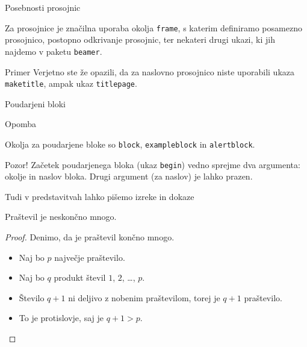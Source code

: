 \begin{frame}{Posebnosti prosojnic}


	Za prosojnice je značilna uporaba okolja \texttt{frame},
	s katerim definiramo posamezno prosojnico,\pause
	postopno odkrivanje prosojnic,\pause
	ter nekateri drugi ukazi, ki jih najdemo v paketu \texttt{beamer}.\pause
	\begin{exampleblock}{Primer}
		Verjetno ste že opazili, da za naslovno prosojnico niste uporabili
		ukaza \texttt{maketitle}, ampak ukaz \texttt{titlepage}.
	\end{exampleblock}
\end{frame}

\begin{frame}{Poudarjeni bloki}
	
		
	
    \begin{exampleblock}{Opomba}
		
	\end{exampleblock}
		Okolja za poudarjene bloke so \texttt{block}, \texttt{exampleblock} in \texttt{alertblock}.
    \begin{alertblock}{Pozor!}
		Začetek poudarjenega bloka (ukaz \texttt{begin}) vedno sprejme 
		dva argumenta: okolje in naslov bloka.
		Drugi argument (za naslov) je lahko prazen. 
	\end{alertblock}

\end{frame}

\begin{frame}{Tudi v predstavitvah lahko pišemo izreke in dokaze}

	

	\begin{izrek}
	   Praštevil je neskončno mnogo.
	\end{izrek}
	\begin{proof}
	   Denimo, da je praštevil končno mnogo.
	   \begin{itemize}[<+->]
		  \item Naj bo \(p\) \alert<4>{največje} praštevilo.
		  \item Naj bo \(q\) produkt števil \(1\), \(2\), \ldots, \(p\).
		  \item Število \(q+1\) ni deljivo z nobenim praštevilom, torej je \(q+1\) praštevilo.
		  \item To je protislovje, saj je \(q+1>p\). \qedhere
	   \end{itemize}
	\end{proof}
 \end{frame}
 
